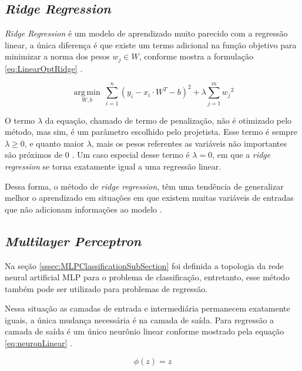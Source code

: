 \subsection{\textit{Ridge Regression}}
\textit{Ridge Regression} é um modelo de aprendizado muito parecido com a regressão linear, a única diferença é que existe um termo adicional na função objetivo para minimizar a norma dos pesos $w_j \in W$, conforme mostra a formulação \ref{eq:LinearOptRidge} \cite{James20131} .

\begin{equation}
\underset {W, b}{\operatorname {arg\,min} }\ \sum_{i=1}^{n} ({y_i -  x_i \cdot W^T- b })^2 +  \lambda \sum_{j=1}^{m} {w_j}^2
\label{eq:LinearOptRidge}
\end{equation}

O termo $\lambda$ da equação, chamado de termo de penalização, não é otimizado pelo método, mas sim, é um parâmetro escolhido pelo projetista. Esse termo é sempre $\lambda \geq 0$, e quanto maior $\lambda$, mais os pesos referentes as variáveis não importantes são próximos de $0$ \cite{Wieringen2015}. Um caso especial desse termo é $\lambda = 0$, em que a \textit{ridge regression} se torna exatamente igual a uma regressão linear.

Dessa forma, o método de \textit{ridge regression}, têm uma tendência de generalizar melhor o aprendizado em situações em que existem muitas variáveis de entradas que não adicionam informações ao modelo \cite{Wieringen2015}.

\subsection{\textit{Multilayer Perceptron}}
Na seção \ref{sssec:MLPClassificationSubSection} foi definida a topologia da rede neural artificial MLP para o problema de classificação, entretanto, esse método também pode ser utilizado para problemas de regressão.

Nessa situação as camadas de entrada e intermediária permanecem exatamente iguais, a única mudança necessária é na camada de saída. Para regressão a camada de saída é um único neurônio linear conforme mostrado pela equação \ref{eq:neuronLinear} \cite{Goodfellow-et-al-2016}.  

\begin{equation}
\phi(z) = z
\label{eq:neuronLinear}
\end{equation}

